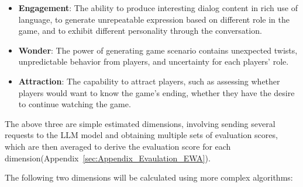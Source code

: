 \begin{itemize}
  \item \textbf{Engagement}: The ability to produce interesting dialog content in rich use of language, to generate unrepeatable expression based on different role in the game, and to exhibit different personality through the conversation.
  \item \textbf{Wonder}: The power of generating game scenario contains unexpected twists, unpredictable behavior from players, and uncertainty for each players' role.
  \item \textbf{Attraction}: The capability to attract players, such as assessing whether players would want to know the game's ending, whether they have the desire to continue watching the game.
\end{itemize}

The above three are simple estimated dimensions, involving sending several requests to the LLM model and obtaining multiple sets of evaluation scores, which are then averaged to derive the evaluation score for each dimension(Appendix~\ref{sec:Appendix_Evaulation_EWA}). 

The following two dimensions will be calculated using more complex algorithms:

